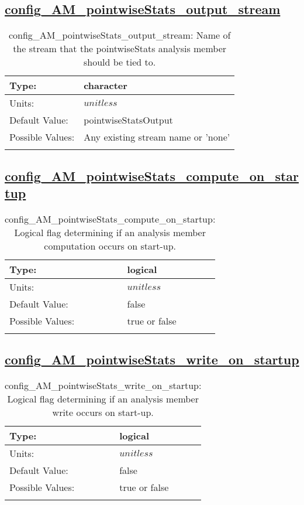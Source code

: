 \subsection[config\_AM\_pointwiseStats\_output\_stream]{\hyperref[sec:nm_tab_AM_pointwiseStats]{config\_AM\_pointwiseStats\_output\_stream}}
\label{subsec:nm_sec_config_AM_pointwiseStats_output_stream}
\begin{center}
\begin{longtable}{| p{2.0in} || p{4.0in} |}
    \hline
    Type: & character \\
    \hline
    Units: & $unitless$ \\
    \hline
    Default Value: & pointwiseStatsOutput \\
    \hline
    Possible Values: & Any existing stream name or 'none' \\
    \hline
    \caption{config\_AM\_pointwiseStats\_output\_stream: Name of the stream that the pointwiseStats analysis member should be tied to.}
\end{longtable}
\end{center}
\subsection[config\_AM\_pointwiseStats\_compute\_on\_startup]{\hyperref[sec:nm_tab_AM_pointwiseStats]{config\_AM\_pointwiseStats\_compute\_on\_startup}}
\label{subsec:nm_sec_config_AM_pointwiseStats_compute_on_startup}
\begin{center}
\begin{longtable}{| p{2.0in} || p{4.0in} |}
    \hline
    Type: & logical \\
    \hline
    Units: & $unitless$ \\
    \hline
    Default Value: & false \\
    \hline
    Possible Values: & true or false \\
    \hline
    \caption{config\_AM\_pointwiseStats\_compute\_on\_startup: Logical flag determining if an analysis member computation occurs on start-up.}
\end{longtable}
\end{center}
\subsection[config\_AM\_pointwiseStats\_write\_on\_startup]{\hyperref[sec:nm_tab_AM_pointwiseStats]{config\_AM\_pointwiseStats\_write\_on\_startup}}
\label{subsec:nm_sec_config_AM_pointwiseStats_write_on_startup}
\begin{center}
\begin{longtable}{| p{2.0in} || p{4.0in} |}
    \hline
    Type: & logical \\
    \hline
    Units: & $unitless$ \\
    \hline
    Default Value: & false \\
    \hline
    Possible Values: & true or false \\
    \hline
    \caption{config\_AM\_pointwiseStats\_write\_on\_startup: Logical flag determining if an analysis member write occurs on start-up.}
\end{longtable}
\end{center}
